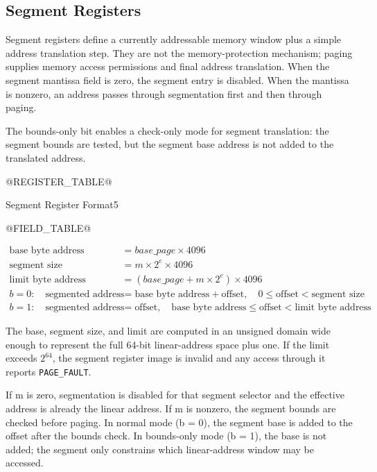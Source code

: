 \Needspace{3.8in}
\subsection{Segment Registers}
Segment registers define a currently addressable memory window plus a simple
address translation step. They are not the memory-protection mechanism; paging
supplies memory access permissions and final address translation. When the
segment mantissa field is zero, the segment entry is disabled. When the mantissa
is nonzero, an address passes through segmentation first and then through
paging.

The bounds-only bit enables a check-only mode for segment translation: the
segment bounds are tested, but the segment base address is not added to the
translated address.

@REGISTER_TABLE@

\begin{manuallistedformatdiagram}{Segment Register Format}{5}
\end{manuallistedformatdiagram}


@FIELD_TABLE@

\begin{align*}
\text{base byte address} &= \mathit{base\_page} \times 4096\\
\text{segment size} &= m \times 2^e \times 4096\\
\text{limit byte address} &= (\mathit{base\_page} + m \times 2^e) \times 4096\\
b=0:\quad \text{segmented address} &= \text{base byte address} + \text{offset},\quad 0 \le \text{offset} < \text{segment size}\\
b=1:\quad \text{segmented address} &= \text{offset},\quad \text{base byte address} \le \text{offset} < \text{limit byte address}
\end{align*}

The base, segment size, and limit are computed in an unsigned domain wide
enough to represent the full 64-bit linear-address space plus one. If the limit
exceeds \(2^{64}\), the segment register image is invalid and any access through
it reports \texttt{PAGE\_FAULT}.

If m is zero, segmentation is disabled for that segment selector and the
effective address is already the linear address. If m is nonzero, the segment
bounds are checked before paging. In normal mode (b = 0), the segment base is
added to the offset after the bounds check. In bounds-only mode (b = 1), the
base is not added; the segment only constrains which linear-address window may
be accessed.
